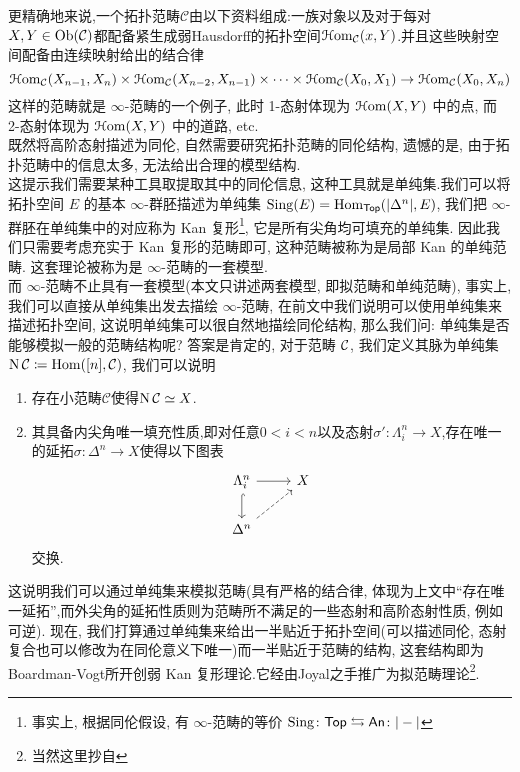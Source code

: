 更精确地来说,一个拓扑范畴$\mathcal{C}$由以下资料组成:一族对象以及对于每对$X,Y\in \operatorname{Ob}(\mathcal{C})$都配备紧生成弱Hausdorff的拓扑空间$\EuScript{H}\mathrm{om}_{\mathcal{C}}(x,Y)$.并且这些映射空间配备由连续映射给出的结合律
\[
\EuScript{H}\mathrm{om}_{\mathcal{C}}(X_{n-1},X_n)\times \EuScript{H}\mathrm{om}_{\mathcal{C}}(X_{n-2},X_{n-1})\times \cdots \times \EuScript{H}\mathrm{om}_{\mathcal{C}}(X_0,X_1) \to \EuScript{H}\mathrm{om}_{\mathcal{C}}(X_0,X_n)
\]
这样的范畴就是 $\infty$-范畴的一个例子, 此时 1-态射体现为 $\EuScript{H}\mathrm{om}(X,Y)$ 中的点, 而 2-态射体现为 $\EuScript{H}\mathrm{om}(X,Y)$ 中的道路, etc.\\
既然将高阶态射描述为同伦, 自然需要研究拓扑范畴的同伦结构, 遗憾的是, 由于拓扑范畴中的信息太多, 无法给出合理的模型结构.\\
这提示我们需要某种工具取提取其中的同伦信息, 这种工具就是单纯集.我们可以将拓扑空间 $E$ 的基本 $\infty$-群胚描述为单纯集 $\operatorname{Sing}(E) = \operatorname{Hom}_{\mathsf{Top}}(|\Delta^n|,E)$, 我们把 $\infty$-群胚在单纯集中的对应称为 Kan 复形\footnote{事实上, 根据同伦假设, 有 $\infty$-范畴的等价 $\operatorname{Sing} \colon \mathsf{Top} \leftrightarrows \mathsf{An} \colon |-|$}, 它是所有尖角均可填充的单纯集. 因此我们只需要考虑充实于 Kan 复形的范畴即可, 这种范畴被称为是局部 Kan 的单纯范畴. 这套理论被称为是 $\infty$-范畴的一套模型.\\
而 $\infty$-范畴不止具有一套模型(本文只讲述两套模型, 即拟范畴和单纯范畴), 事实上, 我们可以直接从单纯集出发去描绘 $\infty$-范畴, 在前文中我们说明可以使用单纯集来描述拓扑空间, 这说明单纯集可以很自然地描绘同伦结构, 那么我们问: 单纯集是否能够模拟一般的范畴结构呢? 答案是肯定的, 对于范畴 $\cal{C}$, 我们定义其脉为单纯集 $\operatorname{N} \mathcal{C} \coloneqq \operatorname{Hom}([n],\cal{C})$, 我们可以说明
\begin{enumerate}
        \item 存在小范畴$\mathcal{C}$使得$\operatorname{N} \mathcal{C} \simeq X$.
        \item 其具备内尖角唯一填充性质,即对任意$0<i<n$以及态射$\sigma' : \Lambda_i^n \to X$,存在唯一的延拓$\sigma : \Delta^n \to X$使得以下图表
        \[\begin{tikzcd}
	{\Lambda_i^n} & X \\
	{\Delta^n}
	\arrow[from=1-1, to=1-2]
	\arrow[hook, from=1-1, to=2-1]
	\arrow[dashed, from=2-1, to=1-2]
        \end{tikzcd}\]
        交换.
\end{enumerate}
这说明我们可以通过单纯集来模拟范畴(具有严格的结合律, 体现为上文中``存在唯一延拓'',而外尖角的延拓性质则为范畴所不满足的一些态射和高阶态射性质, 例如可逆). 现在, 我们打算通过单纯集来给出一半贴近于拓扑空间(可以描述同伦, 态射复合也可以修改为在同伦意义下唯一)而一半贴近于范畴的结构, 这套结构即为 Boardman-Vogt所开创弱 Kan 复形理论.它经由Joyal之手推广为拟范畴理论\footnote{当然这里抄自\cite{HTT}}.
